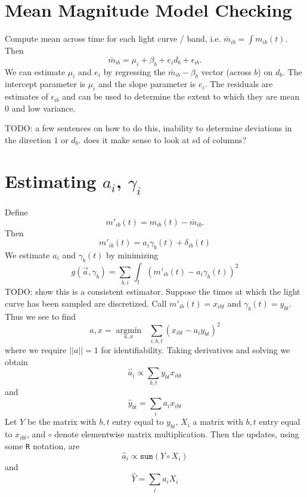 \documentclass[12pt]{article}
\newcommand{\argmin}[1]{\underset{#1}{\operatorname{argmin}}\text{ }}
\newcommand{\todo}[1]{{\color{red}TODO: #1}}
\begin{document}
\section{Mean Magnitude Model Checking}

Compute mean across time for each light curve / band, i.e. $\bar{m}_{ib} = \int m_{ib}(t)$. Then
\begin{equation*}
  \bar{m}_{ib} = \mu_i + \beta_b + e_id_b + \epsilon_{ib}.
\end{equation*}
We can estimate $\mu_i$ and $e_i$ by regressing the $\bar{m}_{ib} - \beta_b$ vector (across $b$) on $d_b$. The intercept parameter is $\mu_i$ and the slope parameter is $e_i$. The residuals are estimates of $\epsilon_{ib}$ and can be used to determine the extent to which they are mean $0$ and low variance.

\todo{a few sentences on how to do this, inability to determine deviations in the direction $1$ or $d_b$. does it make sense to look at sd of columns?}

\section{Estimating $a_i$, $\gamma_i$}

Define
\begin{equation*}
m'_{ib}(t) = m_{ib}(t) - \bar{m}_{ib}.
\end{equation*}
Then
\begin{equation*}
  m'_{ib}(t) = a_i\gamma_b(t) + \delta_{ib}(t)
\end{equation*}
We estimate $a_i$ and $\gamma_b(t)$ by minimizing
\begin{equation*}
  g(\vec{a},\gamma_b) = \sum_{b,i} \int_t (m'_{ib}(t) - a_i \gamma_b(t))^2
\end{equation*}
\todo{show this is a consistent estimator.}
Suppose the times at which the light curve has been sampled are discretized. Call $m'_{ib}(t) = x_{ibt}$ and $\gamma_{b}(t) = y_{bt}$. Thus we see to find
\begin{equation*}
  a,x = \argmin{a,x} \sum_{i,b,t} (x_{ibt} - a_i y_{bt})^2
\end{equation*}
where we require $||a||=1$ for identifiability. Taking derivatives and solving we obtain
\begin{equation*}
  \widehat{a}_i \propto \sum_{b,t} y_{bt}x_{ibt}
\end{equation*}
and
\begin{equation*}
  \widehat{y}_{bt} = \sum_i a_ix_{ibt}
\end{equation*}
Let $Y$ be the matrix with $b,t$ entry equal to $y_{bt}$, $X_i$ a matrix with $b,t$ entry equal to $x_{ibt}$, and $\circ$ denote elementwise matrix multiplication. Then the updates, using some \texttt{R} notation, are
\begin{equation*}
  \widehat{a}_i \propto \texttt{sum}(Y\circ X_i)
\end{equation*}
and
\begin{equation*}
  \widehat{Y} = \sum_i a_iX_i
\end{equation*}



%
%
\end{document}
